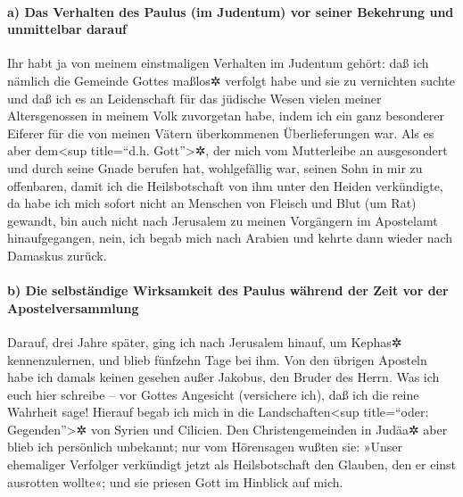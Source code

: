 \hypertarget{a-das-verhalten-des-paulus-im-judentum-vor-seiner-bekehrung-und-unmittelbar-darauf}{%
\paragraph{a) Das Verhalten des Paulus (im Judentum) vor seiner
Bekehrung und unmittelbar
darauf}\label{a-das-verhalten-des-paulus-im-judentum-vor-seiner-bekehrung-und-unmittelbar-darauf}}

 Ihr habt ja von meinem einstmaligen Verhalten im
Judentum gehört: daß ich nämlich die Gemeinde Gottes maßlos✲ verfolgt
habe und sie zu vernichten suchte  und daß ich es an
Leidenschaft für das jüdische Wesen vielen meiner Altersgenossen in
meinem Volk zuvorgetan habe, indem ich ein ganz besonderer Eiferer für
die von meinen Vätern überkommenen Überlieferungen war. 
Als es aber dem\textless sup title=``d.h. Gott''\textgreater✲, der mich
vom Mutterleibe an ausgesondert und durch seine Gnade berufen hat,
wohlgefällig war,  seinen Sohn in mir zu offenbaren,
damit ich die Heilsbotschaft von ihm unter den Heiden verkündigte, da
habe ich mich sofort nicht an Menschen von Fleisch und Blut (um Rat)
gewandt,  bin auch nicht nach Jerusalem zu meinen
Vorgängern im Apostelamt hinaufgegangen, nein, ich begab mich nach
Arabien und kehrte dann wieder nach Damaskus zurück.

\hypertarget{b-die-selbstuxe4ndige-wirksamkeit-des-paulus-wuxe4hrend-der-zeit-vor-der-apostelversammlung}{%
\paragraph{b) Die selbständige Wirksamkeit des Paulus während der Zeit
vor der
Apostelversammlung}\label{b-die-selbstuxe4ndige-wirksamkeit-des-paulus-wuxe4hrend-der-zeit-vor-der-apostelversammlung}}

 Darauf, drei Jahre später, ging ich nach Jerusalem
hinauf, um Kephas✲ kennenzulernen, und blieb fünfzehn Tage bei ihm.
 Von den übrigen Aposteln habe ich damals keinen gesehen
außer Jakobus, den Bruder des Herrn.  Was ich euch hier
schreibe -- vor Gottes Angesicht (versichere ich), daß ich die reine
Wahrheit sage!  Hierauf begab ich mich in die
Landschaften\textless sup title=``oder: Gegenden''\textgreater✲ von
Syrien und Cilicien.  Den Christengemeinden in Judäa✲
aber blieb ich persönlich unbekannt;  nur vom Hörensagen
wußten sie: »Unser ehemaliger Verfolger verkündigt jetzt als
Heilsbotschaft den Glauben, den er einst ausrotten wollte«;
 und sie priesen Gott im Hinblick auf mich.

